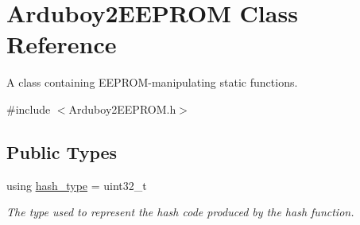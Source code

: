 \hypertarget{classArduboy2EEPROM}{}\section{Arduboy2\+E\+E\+P\+R\+OM Class Reference}
\label{classArduboy2EEPROM}


A {\ttfamily class} containing E\+E\+P\+R\+O\+M-\/manipulating {\ttfamily static} functions.  




{\ttfamily \#include $<$Arduboy2\+E\+E\+P\+R\+O\+M.\+h$>$}

\subsection*{Public Types}
\begin{DoxyCompactItemize}
\item 
\mbox{\label{classArduboy2EEPROM_a6221853153af216c0d6087f1e1455cd7}} 
using \mbox{\hyperlink{classArduboy2EEPROM_a6221853153af216c0d6087f1e1455cd7}{hash\+\_\+type}} = uint32\+\_\+t
\begin{DoxyCompactList}\small\item\em The type used to represent the hash code produced by the {\ttfamily hash} function. \end{DoxyCompactList}\end{DoxyCompactItemize}
